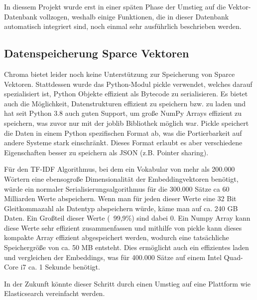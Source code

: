 In diessem Projekt wurde erst in einer späten Phase der Umstieg auf die Vektor-Datenbank vollzogen, weshalb einige Funktionen, die in dieser Datenbank automatisch integriert sind, noch einmal sehr ausführlich beschrieben werden.


\subsection{Datenspeicherung Sparce Vektoren}

Chroma bietet leider noch keine Unterstützung zur Speicherung von Sparce Vektoren.
Stattdessen wurde das Python-Modul pickle verwendet, welches darauf spezialisiert ist, Python Objekte effizient als Bytecode zu serialisieren. 
Es bietet auch die Möglichkeit, Datenstrukturen effizient zu speichern bzw. zu laden und hat seit Python 3.8 auch guten Support, um große NumPy Arrays effizient zu speichern, was zuvor nur mit der joblib Bibliothek möglich war.
Pickle speichert die Daten in einem Python spezifischen Format ab, was die Portierbarkeit auf andere Systeme stark einschränkt. Dieses Format erlaubt es aber verschiedene Eigenschaften besser zu speichern als JSON (z.B. Pointer sharing).

Für den TF-IDF Algorithmus, bei dem ein Vokabular von mehr als 200.000 Wörtern eine ebensogroße Dimensionalität der Embeddingvektoren benötigt, würde ein normaler Serialisierungsalgorithmus für die 300.000 Sätze ca 60 Milliarden Werte abspeichern.
Wenn man für jeden dieser Werte eine 32 Bit Gleitkommazahl als Datentyp abspeichern würde, käme man auf ca. 240 GB Daten. 
Ein Großteil dieser Werte (~99,9\%) sind dabei 0.
Ein Numpy Array kann diese Werte sehr effizient zusammenfassen und mithilfe von pickle kann dieses kompakte Array effizient abgespeichert werden, wodurch eine tatsächliche Speichergröße von ca. 50 MB entsteht.
Dies ermöglicht auch ein effizientes laden und vergleichen der Embeddings, was für 400.000 Sätze auf einem Intel Quad-Core i7 ca. 1 Sekunde benötigt.

In der Zukunft könnte dieser Schritt durch einen Umstieg auf eine Plattform wie Elasticsearch vereinfacht werden.






